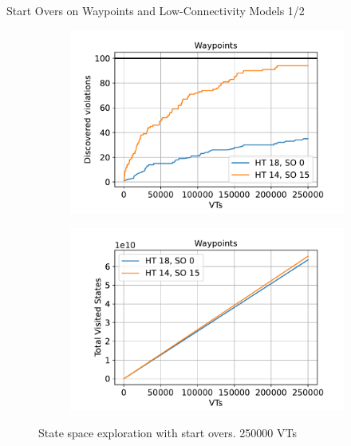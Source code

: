 \documentclass[aspectratio=169]{beamer}
\begin{document}
 {%
  \begin{frame}{Start Overs on Waypoints and Low-Connectivity Models 1/2}
      \begin{figure}
          \begin{subfigure}[b]{.49\textwidth}
              \centering
              \includegraphics[width=\textwidth]{../../evaluation/output-assets/EXP-04-start-overs-1.pdf}
              \label{fig:evaluation:EXP-04:1}
          \end{subfigure}
          \begin{subfigure}[b]{.49\textwidth}
              \centering
              \includegraphics[width=\textwidth]{../../evaluation/output-assets/EXP-04-start-overs-3.pdf}
              \label{fig:evaluation:EXP-04:2}
          \end{subfigure}
          \caption{State space exploration with start overs. \num{250000} VTs}
          \label{fig:evaluation:EXP-04}
      \end{figure}
  \end{frame}

}
\end{document}
